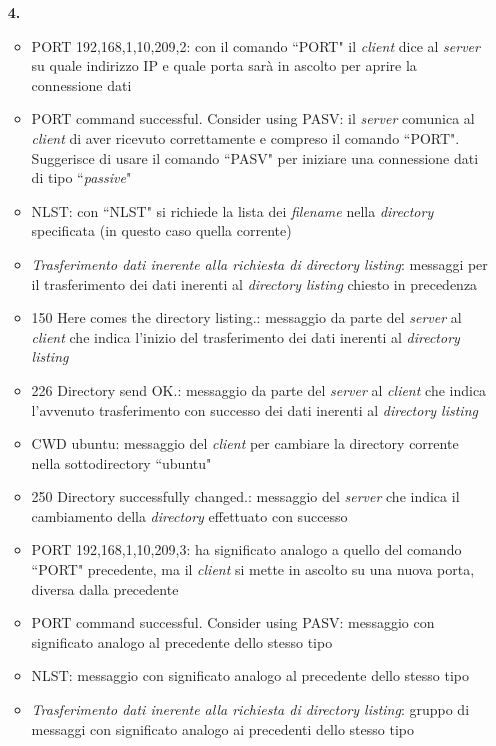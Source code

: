 \documentclass[a4paper, 12pt]{report}
\begin{document}
\begin{enumerate}
    \item [\textbf{4.}]
        \begin{itemize}
            \item PORT 192,168,1,10,209,2: con il comando ``PORT" il \textit{client} dice al \textit{server} su quale indirizzo IP e quale porta sarà in ascolto per aprire la
            connessione dati
            \item PORT command successful. Consider using PASV: il \textit{server} comunica al \textit{client} di aver ricevuto correttamente e compreso il comando ``PORT".
	        Suggerisce di usare il comando ``PASV" per iniziare una connessione dati di tipo ``\textit{passive}"
            \item NLST: con ``NLST" si richiede la lista dei \textit{filename} nella \textit{directory} specificata (in questo caso quella corrente)
            \item \textit{Trasferimento dati inerente alla richiesta di directory listing}: messaggi per il trasferimento dei dati inerenti al \textit{directory listing}
            chiesto in precedenza
	        \item 150 Here comes the directory listing.: messaggio da parte del \textit{server} al \textit{client} che indica l'inizio del trasferimento dei dati inerenti al \textit{directory listing}
	        \item 226 Directory send OK.: messaggio da parte del \textit{server} al \textit{client} che indica l'avvenuto trasferimento con successo dei dati inerenti al \textit{directory listing}    
            \item CWD ubuntu: messaggio del \textit{client} per cambiare la directory corrente nella sottodirectory ``ubuntu"
            \item 250 Directory successfully changed.: messaggio del \textit{server} che indica il cambiamento della \textit{directory} effettuato con successo
            \item PORT 192,168,1,10,209,3: ha significato analogo a quello del comando ``PORT" precedente, ma il \textit{client} si mette in ascolto su una nuova porta, diversa
            dalla precedente
            \item PORT command successful. Consider using PASV: messaggio con significato analogo al precedente dello stesso tipo
            \item NLST: messaggio con significato analogo al precedente dello stesso tipo
            \item \textit{Trasferimento dati inerente alla richiesta di directory listing}: gruppo di messaggi con significato analogo ai precedenti dello stesso tipo

\end{itemize}
\end{enumerate}
\end{document}
